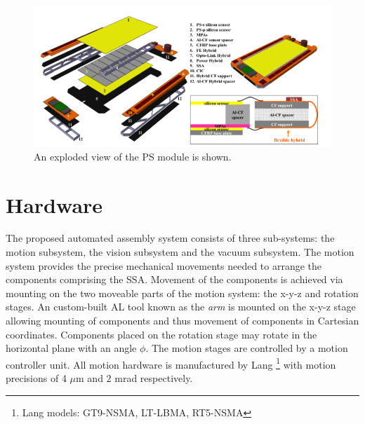 \documentclass[fleqn,10pt]{SelfArx} %
\begin{document}
\begin{figure}[ht]\centering %
\includegraphics[width=\linewidth]{PS.png}
\caption{An exploded view of the PS module is shown.}
\label{fig:PS}
\end{figure}


\section{Hardware}
The proposed automated assembly system consists of three sub-systems: the motion subsystem, the vision subsystem and the vacuum subsystem. 
The motion system provides the precise mechanical movements needed to arrange the components comprising the SSA. Movement of the components is achieved via mounting on the two moveable parts of the motion
system: the x-y-z and rotation stages. An custom-built AL tool known as the \emph{arm} is mounted on the x-y-z stage allowing mounting of components and thus movement of components in Cartesian coordinates. Components placed on the rotation stage may rotate in the horizontal plane with an angle $\phi$. The motion stages are controlled by a motion controller unit. All motion hardware is manufactured by Lang \footnote{Lang models: GT9-NSMA, LT-LBMA, RT5-NSMA} with motion precisions of 4 $\mu$m and $2$ mrad respectively. 
\end{document}
